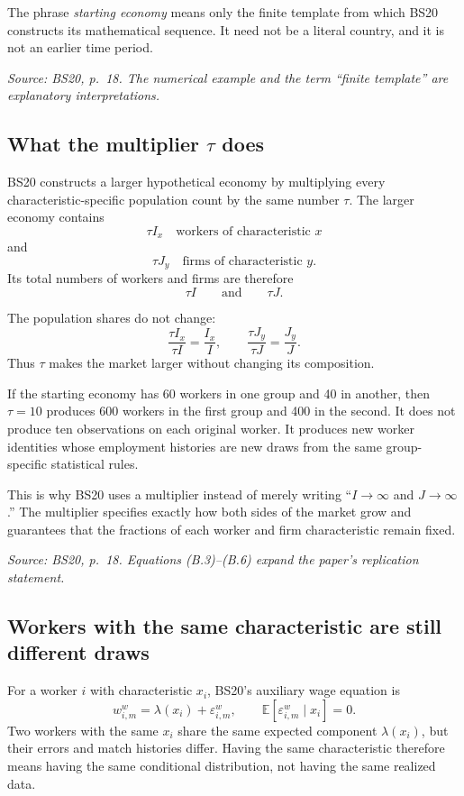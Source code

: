\documentclass[11pt]{article}
\begin{document}
The phrase \emph{starting economy} means only the finite template from which
BS20 constructs its mathematical sequence.  It need not be a literal
country, and it is not an earlier time period.

\textit{Source: BS20, p.\ 18.  The numerical example and the term
``finite template'' are explanatory interpretations.}

\subsection{What the multiplier \(\tau\) does}

BS20 constructs a larger hypothetical economy by multiplying every
characteristic-specific population count by the same number \(\tau\).  The
larger economy contains
\[
\tau I_x
\quad\text{workers of characteristic }x
\tag{B.3}
\]
and
\[
\tau J_y
\quad\text{firms of characteristic }y.
\tag{B.4}
\]
Its total numbers of workers and firms are therefore
\[
\tau I
\qquad\text{and}\qquad
\tau J.
\tag{B.5}
\]

The population shares do not change:
\[
\frac{\tau I_x}{\tau I}=\frac{I_x}{I},
\qquad
\frac{\tau J_y}{\tau J}=\frac{J_y}{J}.
\tag{B.6}
\]
Thus \(\tau\) makes the market larger without changing its composition.

If the starting economy has 60 workers in one group and 40 in another, then
\(\tau=10\) produces 600 workers in the first group and 400 in the second.
It does not produce ten observations on each original worker.  It produces
new worker identities whose employment histories are new draws from the
same group-specific statistical rules.

This is why BS20 uses a multiplier instead of merely writing
``\(I\to\infty\) and \(J\to\infty\).''  The multiplier specifies exactly
how both sides of the market grow and guarantees that the fractions of each
worker and firm characteristic remain fixed.

\textit{Source: BS20, p.\ 18.  Equations (B.3)--(B.6) expand the paper's
replication statement.}

\subsection{Workers with the same characteristic are still different draws}

For a worker \(i\) with characteristic \(x_i\), BS20's auxiliary wage
equation is
\[
w^w_{i,m}
=
\lambda(x_i)+\varepsilon^w_{i,m},
\qquad
\mathbb E[\varepsilon^w_{i,m}\mid x_i]=0.
\tag{B.7}
\]
Two workers with the same \(x_i\) share the same expected component
\(\lambda(x_i)\), but their errors and match histories differ.  Having the
same characteristic therefore means having the same conditional
distribution, not having the same realized data.
\end{document}
